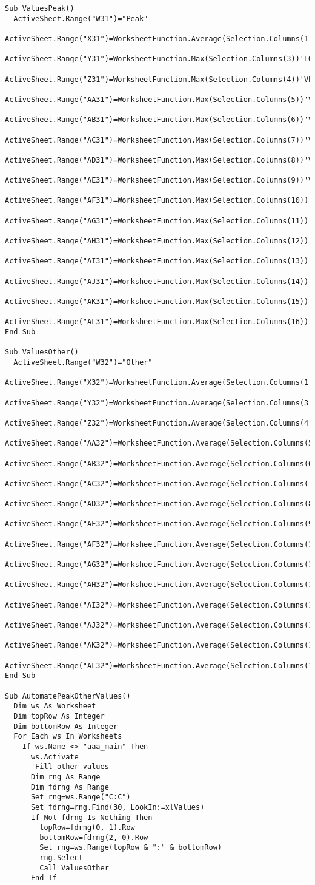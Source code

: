 \begin{lstlisting}
Sub ValuesPeak()
  ActiveSheet.Range("W31")="Peak"
  ActiveSheet.Range("X31")=WorksheetFunction.Average(Selection.Columns(1))'TIME
  ActiveSheet.Range("Y31")=WorksheetFunction.Max(Selection.Columns(3))'LOAD
  ActiveSheet.Range("Z31")=WorksheetFunction.Max(Selection.Columns(4))'VE
  ActiveSheet.Range("AA31")=WorksheetFunction.Max(Selection.Columns(5))'VT
  ActiveSheet.Range("AB31")=WorksheetFunction.Max(Selection.Columns(6))'VO2
  ActiveSheet.Range("AC31")=WorksheetFunction.Max(Selection.Columns(7))'VO2/KG
  ActiveSheet.Range("AD31")=WorksheetFunction.Max(Selection.Columns(8))'VE/VO2
  ActiveSheet.Range("AE31")=WorksheetFunction.Max(Selection.Columns(9))'VCO2
  ActiveSheet.Range("AF31")=WorksheetFunction.Max(Selection.Columns(10))'VE/VCO2
  ActiveSheet.Range("AG31")=WorksheetFunction.Max(Selection.Columns(11))'RER
  ActiveSheet.Range("AH31")=WorksheetFunction.Max(Selection.Columns(12))'PETO2
  ActiveSheet.Range("AI31")=WorksheetFunction.Max(Selection.Columns(13))'PETCO2
  ActiveSheet.Range("AJ31")=WorksheetFunction.Max(Selection.Columns(14))'O2PULSE
  ActiveSheet.Range("AK31")=WorksheetFunction.Max(Selection.Columns(15))'HR
  ActiveSheet.Range("AL31")=WorksheetFunction.Max(Selection.Columns(16))'Bf
End Sub

Sub ValuesOther()
  ActiveSheet.Range("W32")="Other"
  ActiveSheet.Range("X32")=WorksheetFunction.Average(Selection.Columns(1))'TIME
  ActiveSheet.Range("Y32")=WorksheetFunction.Average(Selection.Columns(3))'LOAD
  ActiveSheet.Range("Z32")=WorksheetFunction.Average(Selection.Columns(4))'VE
  ActiveSheet.Range("AA32")=WorksheetFunction.Average(Selection.Columns(5))'VT
  ActiveSheet.Range("AB32")=WorksheetFunction.Average(Selection.Columns(6))'VO2
  ActiveSheet.Range("AC32")=WorksheetFunction.Average(Selection.Columns(7))'VO2/KG
  ActiveSheet.Range("AD32")=WorksheetFunction.Average(Selection.Columns(8))'VE/VO2
  ActiveSheet.Range("AE32")=WorksheetFunction.Average(Selection.Columns(9))'VCO2
  ActiveSheet.Range("AF32")=WorksheetFunction.Average(Selection.Columns(10))'VE/VCO2
  ActiveSheet.Range("AG32")=WorksheetFunction.Average(Selection.Columns(11))'RER
  ActiveSheet.Range("AH32")=WorksheetFunction.Average(Selection.Columns(12))'PETO2
  ActiveSheet.Range("AI32")=WorksheetFunction.Average(Selection.Columns(13))'PETCO2
  ActiveSheet.Range("AJ32")=WorksheetFunction.Average(Selection.Columns(14))'O2PULSE
  ActiveSheet.Range("AK32")=WorksheetFunction.Average(Selection.Columns(15))'HR
  ActiveSheet.Range("AL32")=WorksheetFunction.Average(Selection.Columns(16))'Bf
End Sub

Sub AutomatePeakOtherValues()
  Dim ws As Worksheet
  Dim topRow As Integer
  Dim bottomRow As Integer
  For Each ws In Worksheets
    If ws.Name <> "aaa_main" Then
      ws.Activate
      'Fill other values
      Dim rng As Range
      Dim fdrng As Range
      Set rng=ws.Range("C:C")
      Set fdrng=rng.Find(30, LookIn:=xlValues)
      If Not fdrng Is Nothing Then
        topRow=fdrng(0, 1).Row
        bottomRow=fdrng(2, 0).Row
        Set rng=ws.Range(topRow & ":" & bottomRow)
        rng.Select
        Call ValuesOther
      End If
    

\end{lstlisting}
